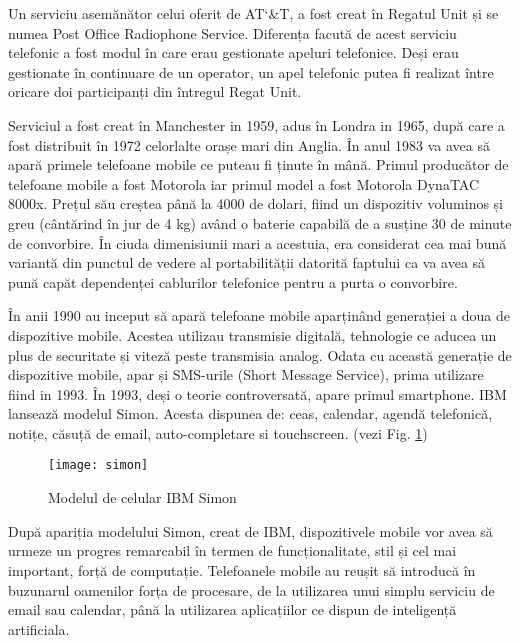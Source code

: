 	Un serviciu asemănător celui oferit de AT\char`&T, a fost creat în Regatul Unit și se numea Post Office Radiophone Service. Diferența facută de acest serviciu telefonic a fost modul în care erau gestionate apeluri telefonice. Deși erau gestionate în continuare de un operator, un apel telefonic putea fi realizat între oricare doi participanți din întregul Regat Unit. 
	
	Serviciul a fost creat în Manchester in 1959, adus în Londra in 1965, după care a fost distribuit în 1972 celorlalte orașe mari din Anglia.
	În anul 1983 va avea să apară primele telefoane mobile ce puteau fi ținute în mână. Primul producător de telefoane mobile a fost Motorola iar primul model a fost Motorola DynaTAC 8000x. Prețul său creștea până la 4000 de dolari, fiind un dispozitiv voluminos și greu (cântărind în jur de 4 kg)  având o baterie capabilă de a susține 30 de minute de convorbire. În ciuda dimenisiunii mari a acestuia, era considerat cea mai bună variantă din punctul de vedere al portabilității datorită faptului ca va avea să pună capăt dependenței cablurilor telefonice pentru a purta o convorbire.

	
	În anii 1990 au inceput să apară telefoane mobile aparținând generației a doua de dispozitive mobile. Acestea utilizau transmisie digitală, tehnologie ce aducea un plus de securitate și viteză peste transmisia analog. Odata cu această generație de dispozitive mobile, apar și SMS-urile (Short Message Service), prima utilizare fiind in 1993.
	În 1993, deși o teorie controversată, apare primul smartphone. IBM lansează modelul Simon. Acesta dispunea de: ceas, calendar, agendă telefonică, notițe, căsuță de email, auto-completare si touchscreen. (vezi Fig. \ref{fig:simon})
	
	
	
	\begin{figure}[H]
		\texttt{[image: simon]}  
		\caption{\label{fig:simon} Modelul de celular IBM Simon
			\protect
			\cite{ibm_simon}}
	\end{figure}
	
	
	După apariția modelului Simon, creat de IBM, dispozitivele mobile vor avea să urmeze un progres remarcabil în termen de funcționalitate, stil și cel mai important, forță de computație. 
	Telefoanele mobile au reușit să introducă în buzunarul oamenilor forța de procesare, de la utilizarea unui simplu serviciu de email sau calendar, până la utilizarea aplicațiilor ce dispun de inteligență artificiala. \cite{history_cellphones}
	\newline
	
